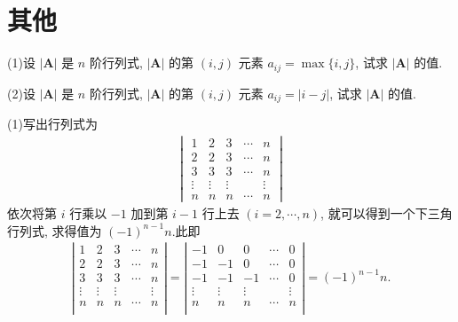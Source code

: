 \documentclass[../../main.tex]{subfiles}
\begin{document}
\section{其他}

\begin{example}\label{example--经典行列式1}
(1)设 \(|\boldsymbol{A}|\) 是 \(n\) 阶行列式, \(|\boldsymbol{A}|\) 的第 \((i,j)\) 元素 \(a_{ij}=\max\{i,j\}\), 试求 \(|\boldsymbol{A}|\) 的值.
 
(2)设 \(|\boldsymbol{A}|\) 是 \(n\) 阶行列式, \(|\boldsymbol{A}|\) 的第 \((i,j)\) 元素 \(a_{ij}=|i - j|\), 试求 \(|\boldsymbol{A}|\) 的值.
\end{example}
\begin{solution}
(1)写出行列式为
\begin{align*}
\begin{vmatrix}
1 & 2 & 3 & \cdots & n \\
2 & 2 & 3 & \cdots & n \\
3 & 3 & 3 & \cdots & n \\
\vdots & \vdots & \vdots & & \vdots \\
n & n & n & \cdots & n
\end{vmatrix}
\end{align*}
依次将第 \(i\) 行乘以 \(-1\) 加到第 \(i - 1\) 行上去 \((i = 2,\cdots,n)\), 就可以得到一个下三角行列式, 求得值为 \((-1)^{n - 1}n\).此即
\begin{align*}
\left| \begin{matrix}
1&		2&		3&		\cdots&		n\\
2&		2&		3&		\cdots&		n\\
3&		3&		3&		\cdots&		n\\
\vdots&		\vdots&		\vdots&		&		\vdots\\
n&		n&		n&		\cdots&		n\\
\end{matrix} \right|=\left| \begin{matrix}
-1&		0&		0&		\cdots&		0\\
-1&		-1&		0&		\cdots&		0\\
-1&		-1&		-1&		\cdots&		0\\
\vdots&		\vdots&		\vdots&		&		\vdots\\
n&		n&		n&		\cdots&		n\\
\end{matrix} \right|=\left( -1 \right) ^{n-1}n.
\end{align*}


\end{solution}
\end{document}
